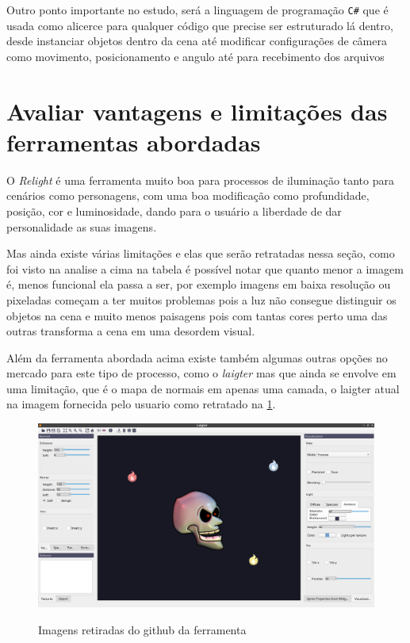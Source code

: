 Outro ponto importante no estudo, será a linguagem de programação \texttt{C\#} que é usada como alicerce para qualquer código que precise ser estruturado lá dentro, desde instanciar objetos dentro da cena até modificar configurações de câmera como movimento, posicionamento e angulo até para recebimento dos arquivos

\section{Avaliar vantagens e limitações das ferramentas abordadas}

O \textit{Relight} é uma ferramenta muito boa para processos de iluminação tanto para cenários como personagens, com uma boa modificação como profundidade, posição, cor e luminosidade, dando para o usuário a liberdade de dar personalidade as suas imagens.

Mas ainda existe várias limitações e elas que serão retratadas nessa seção, como foi visto na analise a cima na tabela é possível notar que quanto menor a imagem é, menos funcional ela passa a ser, por exemplo imagens em baixa resolução ou pixeladas começam a ter muitos problemas pois a luz não consegue distinguir os objetos na cena e muito menos paisagens pois com tantas cores perto uma das outras transforma a cena em uma desordem visual.

Além da ferramenta abordada acima existe também algumas outras opções no mercado para este tipo de processo, como o \textit{laigter} mas que ainda se envolve em uma limitação, que é o mapa de normais em apenas uma camada, o laigter atual na imagem fornecida pelo usuario como retratado na \ref{fig:laigter}.

\FloatBarrier
    \begin{figure}[ht]
        \caption{Imagens retiradas do github da ferramenta}
        \centering
        \includegraphics[scale=0.2]{imagens/laigter_example.png}
        \label{fig:laigter}
    \end{figure}
\FloatBarrier
    
